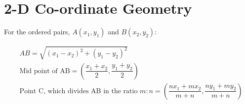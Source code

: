 \documentclass[../main.tex]{subfile}
\begin{document}
	\chapter{2-D Co-ordinate Geometry}
	For the ordered pairs, $A(x_1,y_1)$ and $B(x_2,y_2)$:
	
	\begin{align}
		& AB = \sqrt{ (x_1-x_2)^2 + (y_1-y_2)^2 }\\
		& \text{Mid point of AB} = \left( \dfrac{x_1+x_2}{2},\dfrac{y_1+y_2}{2} \right)\\
		& \text{Point C, which divides AB in the ratio } m:n = \left( \dfrac{nx_1+mx_2}{m+n} , \dfrac{ny_1+my_2}{m+n} \right)
	\end{align}
\end{document}
